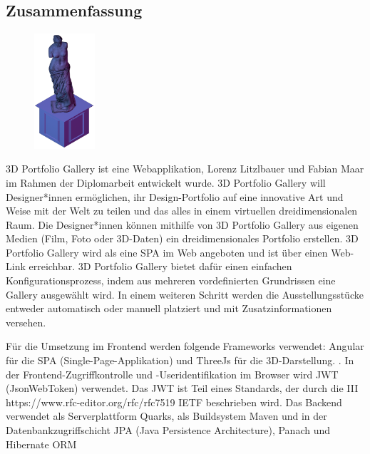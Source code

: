 \newpage
\begin{spacing}{1}
    \chapter*{Zusammenfassung}
\end{spacing}
\begin{figure}
    \begin{center}
      \includegraphics[width=0.2\textwidth]{pics/statue.png}
    \end{center}
\end{figure}
3D Portfolio Gallery ist eine Webapplikation, Lorenz Litzlbauer und Fabian Maar im Rahmen der Diplomarbeit entwickelt wurde. 3D Portfolio Gallery will Designer*innen ermöglichen, ihr Design-Portfolio auf eine innovative Art und Weise mit der Welt zu teilen und das alles in einem virtuellen dreidimensionalen Raum. Die Designer*innen können mithilfe von 3D Portfolio Gallery aus eigenen Medien (Film, Foto oder 3D-Daten) ein dreidimensionales Portfolio erstellen.
3D Portfolio Gallery wird als eine SPA im Web angeboten und ist über einen Web-Link erreichbar.
3D Portfolio Gallery bietet dafür einen einfachen Konfigurationsprozess, indem aus mehreren vordefinierten Grundrissen eine Gallery ausgewählt wird. In einem weiteren Schritt werden die Ausstellungsstücke entweder automatisch oder manuell platziert und mit Zusatzinformationen versehen.


Für die Umsetzung im Frontend werden folgende Frameworks verwendet: Angular für die SPA (Single-Page-Applikation) und ThreeJs für die 3D-Darstellung. . In der Frontend-Zugriffkontrolle und -Useridentifikation im Browser wird JWT (JsonWebToken) verwendet. Das JWT ist Teil eines Standards, der durch die III https://www.rfc-editor.org/rfc/rfc7519 IETF beschrieben wird.
Das Backend verwendet als Serverplattform Quarks, als Buildsystem Maven und in der Datenbankzugriffschicht JPA (Java Persistence Architecture), Panach und Hibernate ORM
